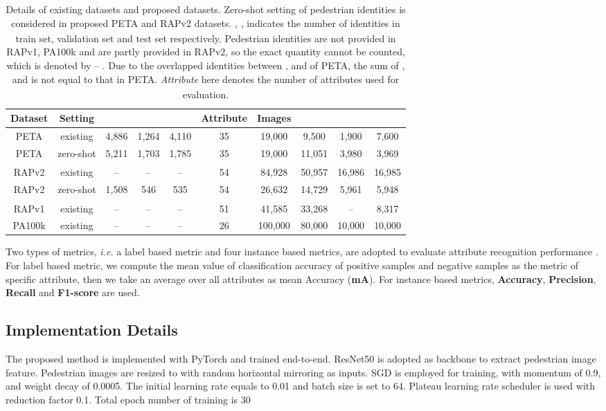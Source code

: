 \documentclass[runningheads]{llncs}
\begin{document}
\begin{table}[ht]
    \centering
        \caption{Details of existing datasets and proposed datasets. Zero-shot setting of pedestrian identities is considered in proposed PETA\textsubscript{} and RAPv2\textsubscript{} datasets. , ,  indicates the number of identities in train set, validation set and test set respectively. Pedestrian identities are not provided in RAPv1, PA100k and are partly provided in RAPv2, so the exact quantity cannot be counted, which is denoted by -- . Due to the overlapped identities between ,  and  of PETA, the sum of ,  and  is not equal to that in PETA\textsubscript{}. \textit{Attribute} here denotes the number of attributes used for evaluation.}
    \label{tab:dataset_partition}

    \begin{tabular}{c|c|c|c|c|c|c|c|c|c}
    \toprule
        Dataset & Setting &  &  &   & Attribute & Images &  &  &  \\ \hline \hline
        PETA & existing & 4,886 & 1,264  & 4,110  & 35 & 19,000 & 9,500 & 1,900 & 7,600 \\
        PETA\textsubscript{} & zero-shot & 5,211 & 1,703 & 1,785 & 35 & 19,000 & 11,051 & 3,980 & 3,969 \\
        RAPv2 & existing & -- & -- & --  & 54 & 84,928 & 50,957 & 16,986 & 16,985 \\
        RAPv2\textsubscript{} & zero-shot & 1,508 & 546 & 535  & 54 & 26,632 & 14,729 & 5,961 & 5,948 \\
        RAPv1 & existing & -- & -- & -- & 51 & 41,585 & 33,268 & -- & 8,317 \\
        PA100k & existing & -- & -- & -- & 26 & 100,000 & 80,000 & 10,000 & 10,000  \\
    \bottomrule
    \end{tabular}
    \vspace{-2em}
\end{table}

Two types of metrics, \textit{i.e.} a label based metric and four instance based metrics, are adopted to evaluate attribute recognition performance \cite{li2018richly}. For label based metric, we compute the mean value of classification accuracy of positive samples and negative samples as the metric of specific attribute, then we take an average over all attributes as mean Accuracy ({\bf mA}). For instance based metrics, {\bf Accuracy}, {\bf Precision}, {\bf Recall} and {\bf F1-score} are used.


\subsection{Implementation Details}
The proposed method is implemented with PyTorch and trained end-to-end. ResNet50 \cite{he2016deep} is adopted as backbone to extract pedestrian image feature. Pedestrian images are resized to  with random horizontal mirroring as inputs. SGD is employed for training, with momentum of 0.9, and weight decay of 0.0005. The initial learning rate equals to 0.01 and batch size is set to 64. Plateau learning rate scheduler is used with reduction factor 0.1. Total epoch number of training is 30
\end{document}
